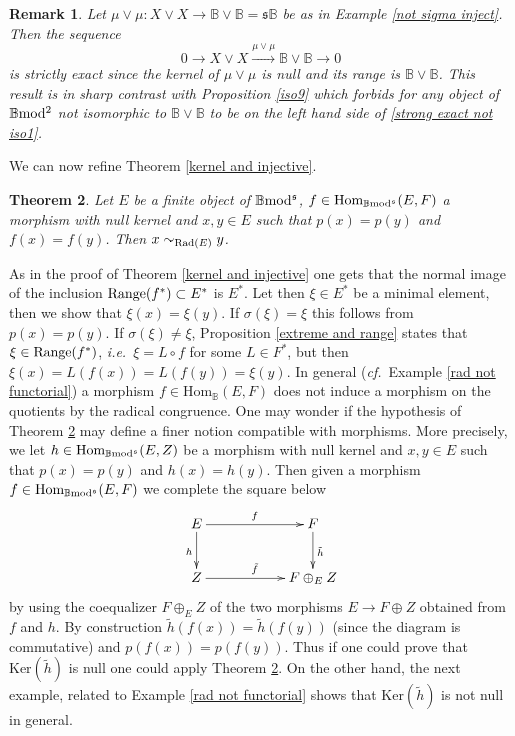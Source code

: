 \documentclass[12pt]{article}
\newtheorem{thm}{Theorem}[section]
\newtheorem{rem}[thm]{Remark}
\def\Hom{{\rm Hom}}
\def\rad{{\rm Rad}}
\def\B{{\mathbb B}}
\def\strgly{strictly }
\newcommand{\ie}{{\it i.e.\/}\ }
\newcommand{\cf}{{\it cf.}}
\def\ker{{\mbox{Ker}}}
\def\Hom {{\mbox{Hom}}}
\def\yb{\mathfrak{s}}
\def\bm2{{\rm \B mod^2}}
\def\b2{{\rm \B mod^{\mathfrak s}}}
\begin{document}
 \begin{rem}\label{strong exact not iso} Let $\mu\vee \mu:X\vee X\to \B\vee \B=\yb\B$ be as in Example \ref{not sigma inject}. Then the sequence 
 \begin{equation}\label{strong exact not iso1}
 	 0\to X\vee X\stackrel{\mu\vee \mu}{\to} \B\vee \B\to 0
 \end{equation}
 	is \strgly exact since the kernel of $\mu\vee \mu$ is null and its range is $\B\vee \B$. This result is in sharp contrast with Proposition \ref{iso9} which forbids for any object of $\bm2$ not isomorphic to $\B\vee \B$ to be on the left hand side of \eqref{strong exact not iso1}.
 \end{rem}
 
We can now refine Theorem \ref{kernel and injective}.
\begin{thm}\label{kernel and injective bis} Let $E$ be a finite object of $\b2$,  $f\in \Hom_\b2(E,F)$ a morphism with null kernel and $x,y\in E$ such that $p(x)=p(y)$ and $f(x)=f(y)$.  Then  $x\sim_{\rad(E)} y$.  
\end{thm}
 \proof As in the proof of Theorem \ref{kernel and injective} one gets that the normal image of the inclusion ${\rm Range}(f^*)\subset E^*$ is $E^*$. Let then $\xi\in E^*$ be a minimal element, then we show that $\xi(x)=\xi(y)$. If $\sigma(\xi)=\xi$ this follows from $p(x)=p(y)$. If $\sigma(\xi)\neq\xi$, Proposition \ref{extreme and range} states that $\xi\in {\rm Range}(f^*)$, \ie $\xi=L\circ  f$ for some $L\in F^*$, but then $\xi(x)=L(f(x))=L(f(y))=\xi(y)$. \endproof    
 In general (\cf~Example \ref{rad not functorial})  a morphism $f\in \Hom_\B(E,F)$ does not induce a morphism on the quotients by the radical congruence. One may wonder if the hypothesis of Theorem \ref{kernel and injective bis} may define a finer notion compatible with morphisms. More precisely, we let $h\in \Hom_\b2(E,Z)$ be a morphism with null kernel and $x,y\in E$ such that $p(x)=p(y)$ and $h(x)=h(y)$.  Then given a morphism $f\in \Hom_\b2(E,F)$ we complete the square below 
\begin{equation}\label{attempt functorial}
\xymatrix@C=25pt@R=25pt{
 E \ar[d]_{h}\ar[rr]^{f} && F\ar[d]^{\tilde h}
\\
 Z \ar[rr]^{\tilde f}&& F\oplus_{E}Z}
\end{equation}
by using the coequalizer $F\oplus_{E}Z$ of the two morphisms $E\to F\oplus Z$ obtained from  $f$ and $h$. By construction $\tilde h(f(x))=\tilde h(f(y))$  (since the diagram is commutative) and $p(f(x))=p(f(y))$. Thus if one could prove that $\ker(\tilde h)$ is null one could apply Theorem \ref{kernel and injective bis}. 
 On the other hand, the next example, related to  Example \ref{rad not functorial} shows that $\ker(\tilde h)$ is not null in general.
 
\end{document}
